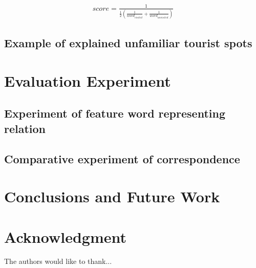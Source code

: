 \documentclass[journal]{IAENGtran}
\begin{document}
\begin{eqnarray}
  score=\frac{1}{\frac{1}{2}(\frac{1}{word_{visited}}+\frac{1}{word_{unvisited}})}
  \label{math:Harmonic Mean}
\end{eqnarray}

\subsection{Example of explained unfamiliar tourist spots}
\label{subsec:Example of explained unfamiliar tourist spots}




\section{Evaluation Experiment}
\label{sec:Evaluation Experiment}
\subsection{Experiment of feature word representing relation}
\label{subsec:Experiment of feature word representing relation}



\subsection{Comparative experiment of correspondence}
\label{subsec:Comparative experiment of correspondence}



\section{Conclusions and Future Work}
\label{sec:Conclusions and Future Work}



\section*{Acknowledgment}


The authors would like to thank...
\end{document}
